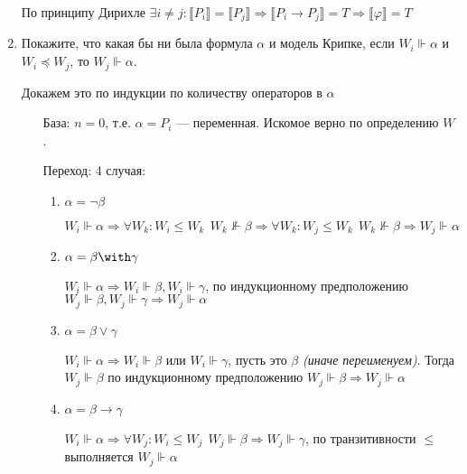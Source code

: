 \begin{enumerate}[wide, labelwidth=!, labelindent=0pt]
            По принципу Дирихле \(\exists i \neq j : \llbracket P_i \rrbracket = \llbracket P_j \rrbracket \Rightarrow \llbracket P_i \to P_j \rrbracket = T \Rightarrow \llbracket \varphi \rrbracket = T\)

      \item Покажите, что какая бы ни была формула $\alpha$ и модель Крипке,
            если $W_i \Vdash \alpha$ и $W_i \preceq W_j$, то $W_j \Vdash \alpha$.

            Докажем это по индукции по количеству операторов в \(\alpha\)

            \begin{itemize}
                  \item [База:] \(n = 0\), т.е. \(\alpha = P_i\) --- переменная. Искомое верно по определению \(W\).
                  \item [Переход:] 4 случая:
                        \begin{enumerate}
                              \item \(\alpha = \neg \beta\)

                                    \(W_i \Vdash \alpha \Rightarrow \forall W_k: W_i \leq W_k \ \ W_k \nVdash \beta \Rightarrow \forall W_k: W_j \leq W_k \ \ W_k \nVdash \beta \Rightarrow W_j \Vdash \alpha\)

                              \item \(\alpha = \beta \with \gamma\)

                                    \(W_i \Vdash \alpha \Rightarrow W_i \Vdash \beta, W_i \Vdash \gamma\), по индукционному предположению \(W_j \Vdash \beta, W_j \Vdash \gamma \Rightarrow W_j \Vdash \alpha\)

                              \item \(\alpha = \beta \lor \gamma\)

                                    \(W_i \Vdash \alpha \Rightarrow W_i \Vdash \beta\) или \(W_i \Vdash \gamma\), пусть это \(\beta\) \textit{(иначе переименуем)}. Тогда \(W_j \Vdash \beta\) по индукционному предположению \(W_j \Vdash \beta \Rightarrow W_j \Vdash \alpha\)

                              \item \(\alpha = \beta \to \gamma\)

                                    \(W_i \Vdash \alpha \Rightarrow \forall W_j : W_i \leq W_j \ \ W_j \Vdash \beta \Rightarrow W_j \Vdash \gamma\), по транзитивности \( \leq \) выполняется \(W_j \Vdash \alpha\)
                        \end{enumerate}
            \end{itemize}


\end{enumerate}
